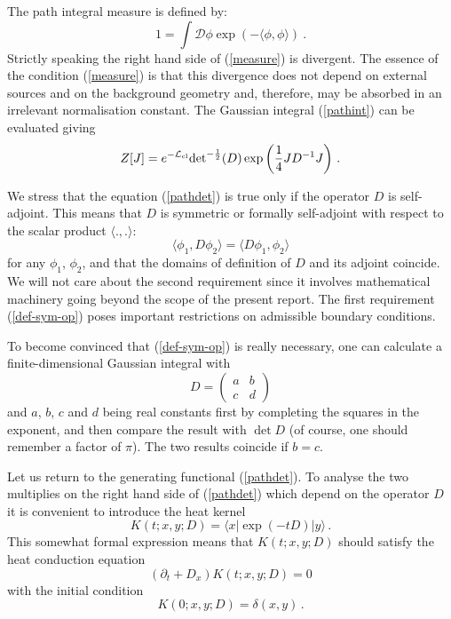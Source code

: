 The path integral measure is defined by:
\begin{equation}
1=\int \mathcal{D} \phi \exp (-\langle\phi ,\phi \rangle) \ . \label{measure}
\end{equation}
Strictly speaking the right hand side of (\ref{measure}) is divergent.
The essence of the condition (\ref{measure}) is that
this divergence does not depend on external sources and on the
background geometry and, therefore, may be absorbed in an irrelevant
normalisation constant. 
The Gaussian integral (\ref{pathint}) can be evaluated giving
\begin{equation}
Z[J]=e^{-\mathcal{L}_{\rm cl}}
{\det }^{-\frac 12} (D) \exp \left( \frac 14 J D^{-1} J \right)
 \, . \label{pathdet}
\end{equation}

We stress that the equation (\ref{pathdet}) is true only if
the operator $D$ is self-adjoint. This means that $D$ is 
symmetric or formally self-adjoint with respect to the
scalar product $\langle .,.\rangle$:
\begin{equation}
\langle \phi_1,D\phi_2 \rangle =
\langle D\phi_1,\phi_2 \rangle \label{def-sym-op}
\end{equation}
for any $\phi_1$, $\phi_2$, and that the domains of definition
of $D$ and its adjoint coincide. We will not care about the
second requirement since it involves mathematical machinery
\cite{ReedSimon}
going beyond the scope of the present report. The first requirement
(\ref{def-sym-op}) poses important restrictions on admissible
boundary conditions.

To become convinced that (\ref{def-sym-op}) is really necessary,
one can calculate a finite-dimensional Gaussian integral
with 
\begin{equation}
D=\left( \begin{array}{cc} a & b \\ c& d \end{array} \right)
\end{equation}
and $a$, $b$, $c$ and $d$ being real constants first by completing the
squares in the exponent, and then compare the result with
$\det D$ (of course, one should remember a factor
of $\pi$). The two results coincide if $b=c$.

Let us return to the generating functional (\ref{pathdet}).
To analyse the two multiplies on the right hand side of
(\ref{pathdet}) which depend on the operator $D$ it is
convenient to introduce the heat kernel
\begin{equation}
K(t;x,y;D)=\langle x| \exp (-tD) | y\rangle \,.
\label{hkmatrel}
\end{equation}
This somewhat formal expression means that $K(t;x,y;D)$ should
satisfy the heat conduction equation 
\begin{equation}
(\partial_t+D_x) K(t;x,y;D)=0 \label{heateq}
\end{equation}
with the initial condition
\begin{equation}
K(0;x,y;D)=\delta (x,y)\,.\label{inicon}
\end{equation}

